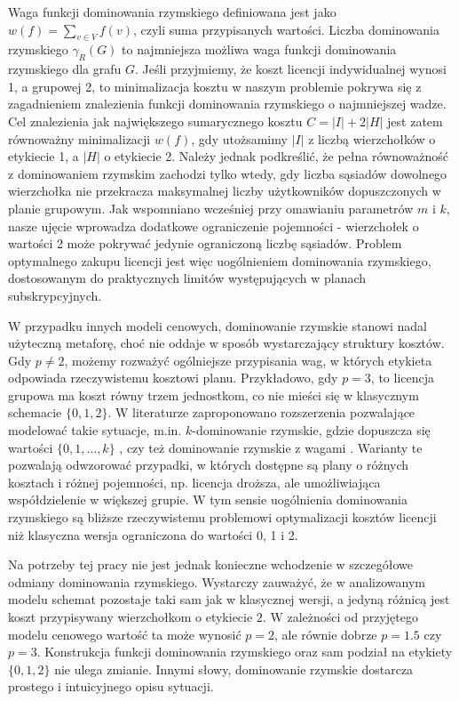 Waga funkcji dominowania rzymskiego definiowana jest jako $w(f) = \sum_{v \in V} f(v)$, czyli suma przypisanych wartości. Liczba dominowania rzymskiego $\gamma_R(G)$ to najmniejsza możliwa waga funkcji dominowania rzymskiego dla grafu $G$. Jeśli przyjmiemy, że koszt licencji indywidualnej wynosi 1, a grupowej 2, to minimalizacja kosztu w naszym problemie pokrywa się z zagadnieniem znalezienia funkcji dominowania rzymskiego o najmniejszej wadze. Cel znalezienia jak największego sumarycznego kosztu $C = |I| + 2|H|$ jest zatem równoważny minimalizacji $w(f)$, gdy utożsamimy $|I|$ z liczbą wierzchołków o etykiecie 1, a $|H|$ o etykiecie 2. Należy jednak podkreślić, że pełna równoważność z dominowaniem rzymskim zachodzi tylko wtedy, gdy liczba sąsiadów dowolnego wierzchołka nie przekracza maksymalnej liczby użytkowników dopuszczonych w planie grupowym. Jak wspomniano wcześniej przy omawianiu parametrów $m$ i $k$, nasze ujęcie wprowadza dodatkowe ograniczenie pojemności - wierzchołek o wartości 2 może pokrywać jedynie ograniczoną liczbę sąsiadów. Problem optymalnego zakupu licencji jest więc uogólnieniem dominowania rzymskiego, dostosowanym do praktycznych limitów występujących w planach subskrypcyjnych.

W przypadku innych modeli cenowych, dominowanie rzymskie stanowi nadal użyteczną metaforę, choć nie oddaje w sposób wystarczający struktury kosztów. Gdy $p \neq 2$, możemy rozważyć ogólniejsze przypisania wag, w których etykieta odpowiada rzeczywistemu kosztowi planu. Przykładowo, gdy $p=3$, to licencja grupowa ma koszt równy trzem jednostkom, co nie mieści się w klasycznym schemacie $\{0,1,2\}$. W literaturze zaproponowano rozszerzenia pozwalające modelować takie sytuacje, m.in. $k$-dominowanie rzymskie, gdzie dopuszcza się wartości $\{0,1,\dots,k\}$ \cite{CHAUDHARY2024301}, czy też dominowanie rzymskie z wagami \cite{Ghaffari2020}. Warianty te pozwalają odwzorować przypadki, w których dostępne są plany o różnych kosztach i różnej pojemności, np. licencja droższa, ale umożliwiająca współdzielenie w większej grupie. W tym sensie uogólnienia dominowania rzymskiego są bliższe rzeczywistemu problemowi optymalizacji kosztów licencji niż klasyczna wersja ograniczona do wartości 0, 1 i 2.

Na potrzeby tej pracy nie jest jednak konieczne wchodzenie w szczegółowe odmiany dominowania rzymskiego. Wystarczy zauważyć, że w analizowanym modelu schemat pozostaje taki sam jak w klasycznej wersji, a jedyną różnicą jest koszt przypisywany wierzchołkom o etykiecie $2$. W zależności od przyjętego modelu cenowego wartość ta może wynosić $p=2$, ale równie dobrze $p=1.5$ czy $p=3$. Konstrukcja funkcji dominowania rzymskiego oraz sam podział na etykiety $\{0,1,2\}$ nie ulega zmianie. Innymi słowy, dominowanie rzymskie dostarcza prostego i intuicyjnego opisu sytuacji.

